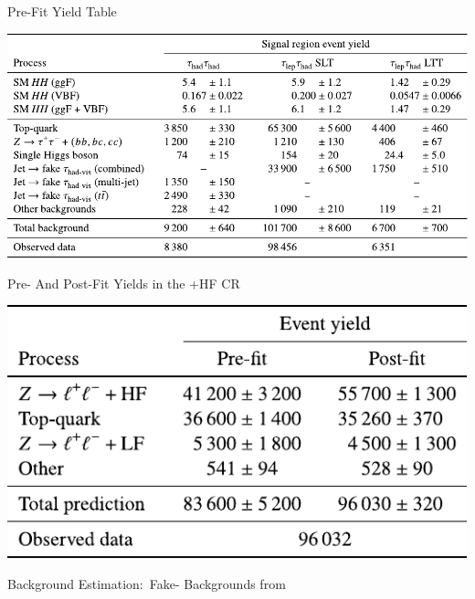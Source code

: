 \documentclass[11pt, xcolor={dvipsnames}, aspectratio=169, notes]{beamer}
\begin{document}

\begin{frame}{Pre-Fit Yield Table}
  \centering

  \includegraphics[scale=0.9]{yieldtable_prefit}
\end{frame}


\begin{frame}{Pre- And Post-Fit Yields in the +HF CR}
  \centering

  \includegraphics[scale=0.9]{backup/zhf_yields}
\end{frame}


\begin{frame}[standout]
  Background Estimation:\ Fake-\allbold{\tauhadvis} Backgrounds from
  \allbold{\ttbar}
\end{frame}

\end{document}
